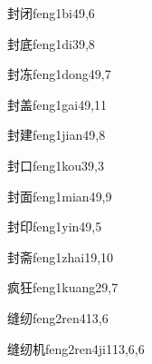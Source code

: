 \begin{entry}{封闭}{feng1bi4}{9,6}
\end{entry}

\begin{entry}{封底}{feng1di3}{9,8}
\end{entry}

\begin{entry}{封冻}{feng1dong4}{9,7}
\end{entry}

\begin{entry}{封盖}{feng1gai4}{9,11}
\end{entry}

\begin{entry}{封建}{feng1jian4}{9,8}
\end{entry}

\begin{entry}{封口}{feng1kou3}{9,3}
\end{entry}

\begin{entry}{封面}{feng1mian4}{9,9}
\end{entry}

\begin{entry}{封印}{feng1yin4}{9,5}
\end{entry}

\begin{entry}{封斋}{feng1zhai1}{9,10}
\end{entry}

\begin{entry}{疯狂}{feng1kuang2}{9,7}
\end{entry}

\begin{entry}{缝纫}{feng2ren4}{13,6}
\end{entry}

\begin{entry}{缝纫机}{feng2ren4ji1}{13,6,6}
\end{entry}

